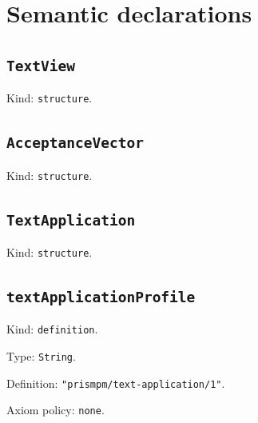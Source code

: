 \documentclass[11pt]{article}
\begin{document}
\section*{Semantic declarations}
\subsection*{\texttt{TextView}}
\noindent Kind: \texttt{structure}.\par
\subsection*{\texttt{AcceptanceVector}}
\noindent Kind: \texttt{structure}.\par
\subsection*{\texttt{TextApplication}}
\noindent Kind: \texttt{structure}.\par
\subsection*{\texttt{textApplicationProfile}}
\noindent Kind: \texttt{definition}.\par
\noindent Type: \texttt{String}.\par
\noindent Definition: \texttt{"prismpm/text-application/1"}.\par
\noindent Axiom policy: \texttt{none}.\par
\end{document}
